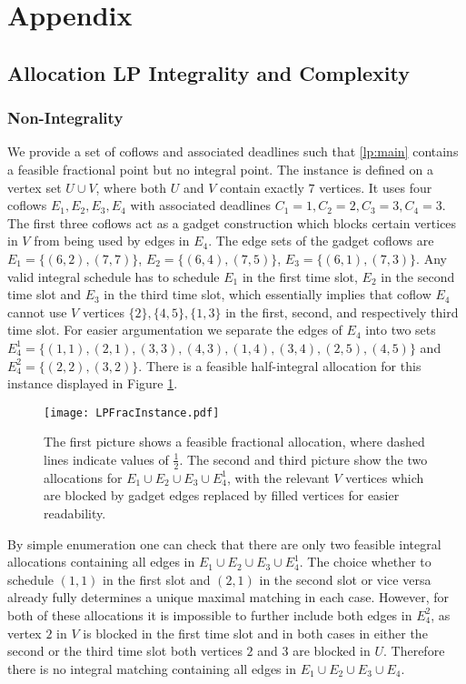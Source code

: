 \documentclass[11pt]{article}
\begin{document}
\printbibliography

\section{Appendix}\label{sec:app}
\subsection{Allocation LP Integrality and Complexity}\label{sec:app:lpintegrality}
\subsubsection*{Non-Integrality}
We provide a set of coflows and associated deadlines such that \ref{lp:main} contains a feasible fractional point but no integral point. The instance is defined on a vertex set $U \cup V$, where both $U$ and $V$ contain exactly $7$ vertices. It uses four coflows $E_1,E_2,E_3, E_4$ with associated deadlines $C_1 = 1, C_2 = 2, C_3 = 3, C_4 = 3$. The first three coflows act as a gadget construction which blocks certain vertices in $V$ from being used by edges in $E_4$. The edge sets of the gadget coflows are $E_1 = \{(6,2),(7,7)\}$,  $E_2 = \{(6,4),(7,5)\}$, $E_3 = \{(6,1),(7,3)\}$. Any valid integral schedule has to schedule $E_1$ in the first time slot, $E_2$ in the second time slot and $E_3$ in the third time slot, which essentially implies that coflow $E_4$ cannot use $V$ vertices $\{2\}, \{4,5\}, \{1,3\}$ in the first, second, and respectively third time slot. For easier argumentation we separate the edges of $E_4$ into two sets $E_4^1 = \{(1,1),(2,1),(3,3),(4,3),(1,4),(3,4),(2,5),(4,5)\}$ and $E_4^2 = \{(2,2),(3,2)\}$. There is a feasible half-integral allocation for this instance displayed in Figure \ref{fig:lpintegralitymatching}. 

\begin{figure}[H]
\centering
\texttt{[image: LPFracInstance.pdf]}
\caption{The first picture shows a feasible fractional allocation, where dashed lines indicate values of $\tfrac{1}{2}$. The second and third picture show the two allocations for $E_1 \cup E_2 \cup E_3 \cup E_4^1$, with the relevant $V$ vertices which are blocked by gadget edges replaced by filled vertices for easier readability.}
\label{fig:lpintegralitymatching}
\end{figure}

By simple enumeration one can check that there are only two feasible integral allocations containing all edges in $E_1 \cup E_2 \cup E_3 \cup E_4^1$. The choice whether to schedule $(1,1)$ in the first slot and $(2,1)$ in the second slot or vice versa already fully determines a unique maximal matching in each case. However, for both of these allocations it is impossible to further include both edges in $E_4^2$, as vertex $2$ in $V$ is blocked in the first time slot and in both cases in either the second or the third time slot both vertices $2$ and $3$ are blocked in $U$. Therefore there is no integral matching containing all edges in $E_1 \cup E_2 \cup E_3 \cup E_4$.
\end{document}
